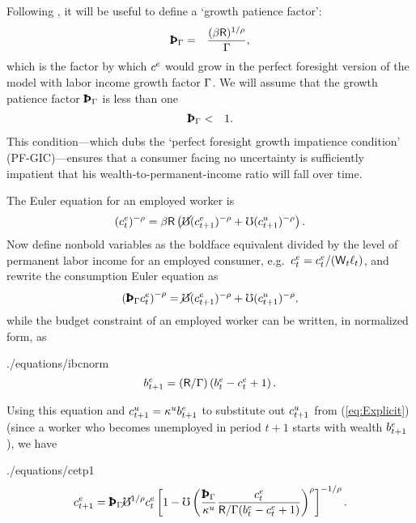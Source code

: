 \documentclass[titlepage,abstract,letterpaper]{econtex}
\begin{document}
Following \cite{BufferStockTheory}, it will be useful to define a `growth patience factor':
\begin{eqnarray}
  \PatPGro & = & \frac{(\Discount \Rfree)^{1/\CRRA}}{\PGro},
  \label{eq:PatPGro}
\end{eqnarray}
which is the factor by which $c^{e}$ would grow in the
perfect foresight version of the model with labor income growth factor
$\Gamma$.  We will assume that the growth patience factor $\PatPGro$ is less than one
\begin{eqnarray}
\PatPGro & < & 1.
\label{eq:GIC}
\end{eqnarray}
This condition---which \cite{BufferStockTheory} dubs the `perfect foresight growth impatience condition' (PF-GIC)---ensures that a
consumer facing no uncertainty is sufficiently impatient that his
wealth-to-permanent-income ratio will fall over time.

The Euler equation for an employed worker is
\begin{equation*}
(c^{e}_t)^{-\rho} = \beta \mathsf{R} \left(\cancel{\mho}(c^{e}_{t+1})^{-\rho}+\mho (c^{u}_{t+1})^{-\rho} \right).
\end{equation*}
Now define nonbold variables as the boldface equivalent divided
by the level of permanent labor income for an employed consumer, e.g.\ $c^{e}_{t}=c^{e}_{t}/(\mathsf{W}_{t}\ell_{t})$, and rewrite the
consumption Euler equation as
\begin{equation}
\left( \PatPGro \cRatE_t \right)^{-\CRRA}= \erate (\cRatE_{t+1})^{-\CRRA}+\urate (\cRatU_{t+1})^{-\CRRA}
  \label{eq:Explicit},
\end{equation}
while the budget constraint of an employed worker can be written, in normalized form, as
\begin{verbatimwrite}{./equations/ibcnorm}
\begin{equation}
b^{e}_{t+1} = (\mathsf{R}/\Gamma)\left(b^{e}_{t} -c^{e}_{t}+1\right).
\label{eq:ibcnorm}
\end{equation}
\end{verbatimwrite}


Using this equation and $c^{u}_{t+1} = \kappa^{u} b^{e}_{t+1}$ to substitute out $c^{u}_{t+1}$ from (\ref{eq:Explicit}) (since a worker who becomes unemployed in period $t+1$ starts with wealth $b^e_{t+1}$), we have
\begin{verbatimwrite}{./equations/cetp1}
\begin{equation}
\cRatE_{t+1}=\PatPGro \erate^{1/\CRRA} \cRatE_t
\left[1-\urate\left(\frac{\PatPGro}{\MPCU} \frac{\cRatE_t}{\Rfree/\PGro(\bRatE_{t} -\cRatE_{t}+1)}\right)^{\CRRA}\right]^{-1/\CRRA}.
\label{eq:cetp1}
\end{equation}
\end{verbatimwrite}

\end{document}
